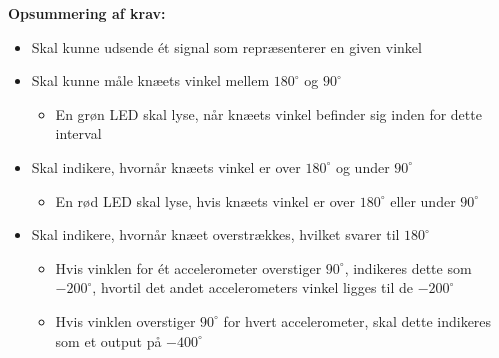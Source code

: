 \vspace{3mm}
\textbf{Opsummering af krav:}
\begin{itemize}
\item[\text{\sffamily \checkmark}] Skal kunne udsende ét signal som repræsenterer en given vinkel
\item[\text{\sffamily \checkmark}] Skal kunne måle knæets vinkel mellem $180^{\circ}$ og $90^{\circ}$
\begin{itemize}
\item En grøn LED skal lyse, når knæets vinkel befinder sig inden for dette interval
\end{itemize}
\item[\text{\sffamily \checkmark}] Skal indikere, hvornår knæets vinkel er over $180^{\circ}$ og under $90^{\circ}$
\begin{itemize}
\item En rød LED skal lyse, hvis knæets vinkel er over $180^{\circ}$ eller under $90^{\circ}$
\end{itemize}
\item[\text{\sffamily \checkmark}] Skal indikere, hvornår knæet overstrækkes, hvilket svarer til $180^{\circ}$
\begin{itemize}
\item Hvis vinklen for ét accelerometer overstiger $90^{\circ}$, indikeres dette som $-200^{\circ}$, hvortil det andet accelerometers vinkel ligges til de $-200^{\circ}$
\item Hvis vinklen overstiger $90^{\circ}$ for hvert accelerometer, skal dette indikeres som et output på $-400^{\circ}$
\end{itemize}
\end{itemize}
